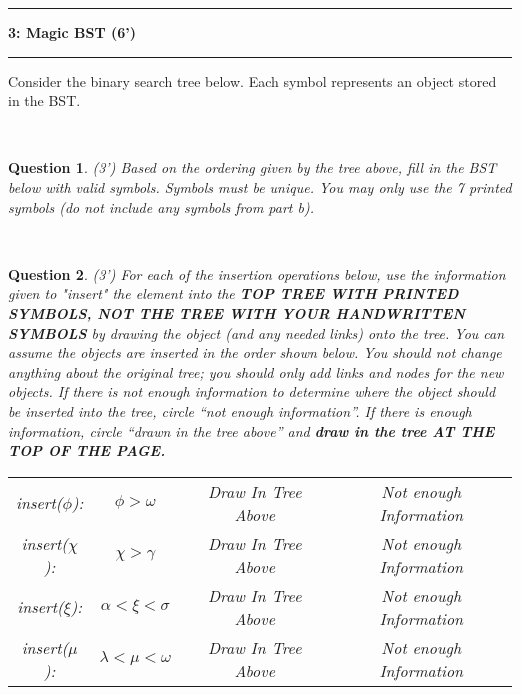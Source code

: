 \documentclass[10.5pt]{article}
\newcommand\question[2]{\vspace{.25in}\hrule\textbf{#1: #2}\vspace{.5em}\hrule\vspace{.10in}}
\newtheorem{Q}{Question}
\begin{document}
\pagebreak

\question{3}{Magic BST (6')}
Consider the binary search tree below. Each symbol represents an object stored in the BST. \\
\begin{minipage}{1\textwidth}
	\centering
\end{minipage} \\
\begin{Q} (3') Based on the ordering given by the tree above, fill in the BST below with valid symbols. Symbols
must be unique. You may only use the 7 printed symbols (do not include any symbols from part b).
\begin{minipage}{1\textwidth}
	\centering
\end{minipage} \\
\end{Q}

\begin{Q} (3') For each of the insertion operations below, use the information given to "insert" the element into the
\textbf{TOP TREE WITH PRINTED SYMBOLS, NOT THE TREE WITH YOUR HANDWRITTEN 
SYMBOLS} by drawing the object (and any needed links) onto the tree. You can assume the objects are
inserted in the order shown below. You should not change anything about the original tree; you should
only add links and nodes for the new objects. If there is not enough information to determine where the
object should be inserted into the tree, circle “not enough information”. If there is enough information,
circle “drawn in the tree above” and \textbf{draw in the tree AT THE TOP OF THE PAGE.}

\begin{table}[htbp]
	\centering
	\begin{tabular}{cccc}
		insert($\phi$): & $\phi>\omega$ & Draw In Tree Above & Not enough Information \\ 
		insert($\chi$): & $\chi>\gamma$&  Draw In Tree Above & Not enough Information \\
		insert($\xi$): & $\alpha<\xi<\sigma$&  Draw In Tree Above & Not enough Information \\
		insert($\mu$): & $\lambda<\mu<\omega$&  Draw In Tree Above & Not enough Information \\
	\end{tabular} 
\end{table}
\end{Q}
\end{document}
